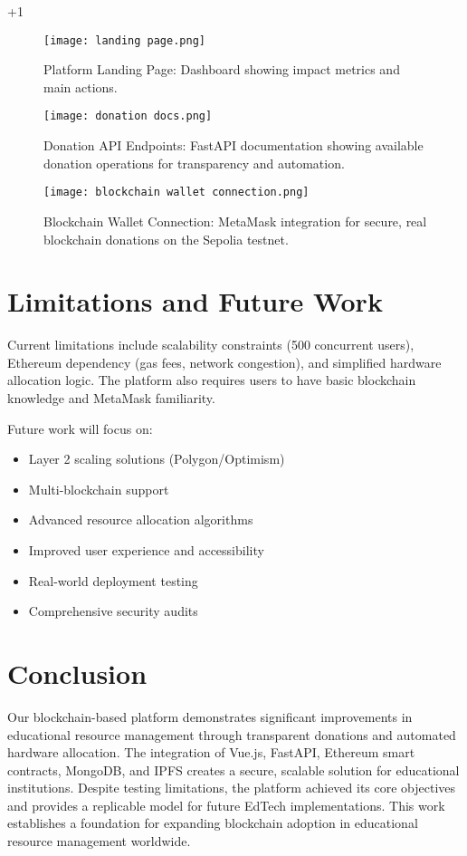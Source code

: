+1\documentclass[conference]{IEEEtran}
\begin{document}
\begin{figure}[ht]
\centering
\texttt{[image: landing page.png]}
\caption{Platform Landing Page: Dashboard showing impact metrics and main actions.}
\label{fig:landingpage}
\end{figure}

\begin{figure}[ht]
\centering
\texttt{[image: donation docs.png]}
\caption{Donation API Endpoints: FastAPI documentation showing available donation operations for transparency and automation.}
\label{fig:donationapi}
\end{figure}

\begin{figure}[ht]
\centering
\texttt{[image: blockchain wallet connection.png]}
\caption{Blockchain Wallet Connection: MetaMask integration for secure, real blockchain donations on the Sepolia testnet.}
\label{fig:walletconnect}
\end{figure}

\section{Limitations and Future Work}
Current limitations include scalability constraints (500 concurrent users), Ethereum dependency (gas fees, network congestion), and simplified hardware allocation logic. The platform also requires users to have basic blockchain knowledge and MetaMask familiarity.

Future work will focus on:
\begin{itemize}
    \item Layer 2 scaling solutions (Polygon/Optimism)
    \item Multi-blockchain support
    \item Advanced resource allocation algorithms
    \item Improved user experience and accessibility
    \item Real-world deployment testing
    \item Comprehensive security audits
\end{itemize}

\section{Conclusion}
Our blockchain-based platform demonstrates significant improvements in educational resource management through transparent donations and automated hardware allocation. The integration of Vue.js, FastAPI, Ethereum smart contracts, MongoDB, and IPFS creates a secure, scalable solution for educational institutions. Despite testing limitations, the platform achieved its core objectives and provides a replicable model for future EdTech implementations. This work establishes a foundation for expanding blockchain adoption in educational resource management worldwide.
\end{document}
